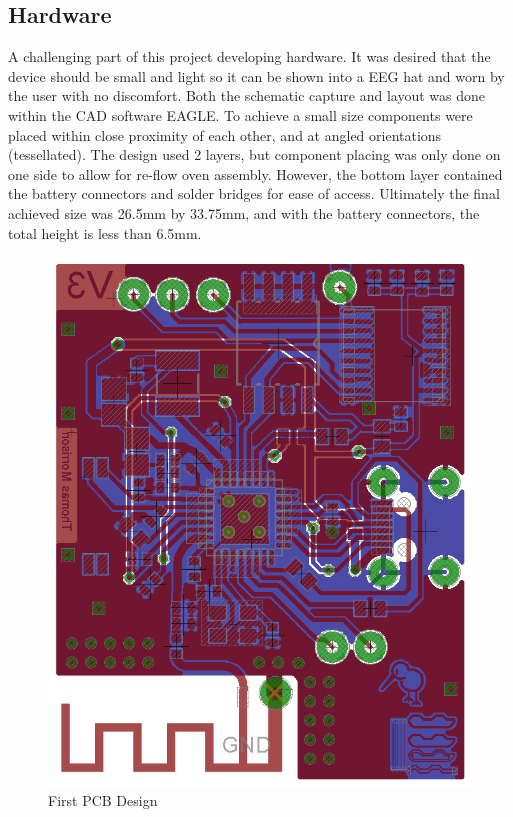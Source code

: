 \documentclass[]{article}
\begin{document}
\subsection{Hardware}

A challenging part of this project developing hardware. It was desired that the device should be small and light so it can be shown into a \ac{EEG} hat and worn by the user with no discomfort. Both the schematic capture and layout was done within the \ac{CAD} software EAGLE. To achieve a small size components were placed within close proximity of each other, and at angled orientations (tessellated). The design used 2 layers, but component placing was only done on one side to allow for re-flow oven assembly. However, the bottom layer contained the battery connectors and solder bridges for ease of access. Ultimately the final achieved size was 26.5mm by 33.75mm, and with the battery connectors, the total height is less than 6.5mm.

\begin{figure}[H]
	\begin{center}
		\includegraphics[width = \textwidth]{boardv1}
	\end{center}
	\caption{First PCB Design}
	\label{fig:boardv1}
\end{figure}
\end{document}
